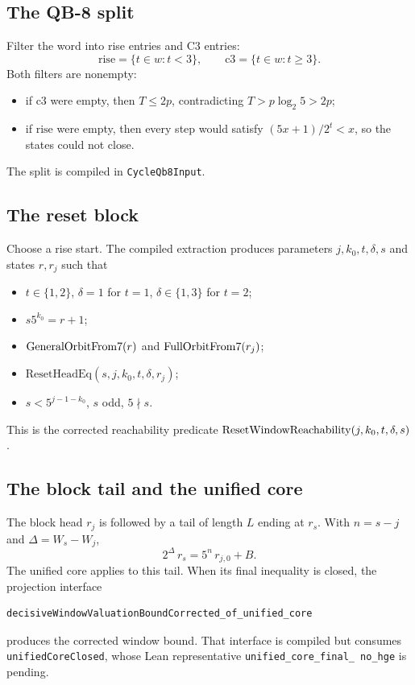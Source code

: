 \subsection{The QB-8 split}

Filter the word into rise entries and C3 entries:
\begin{equation*}
  \mathrm{rise}=\{t\in w:t<3\},
  \qquad
  \mathrm{c3}=\{t\in w:t\ge3\}.
\end{equation*}
Both filters are nonempty:
\begin{itemize}[leftmargin=*]
\item if $\mathrm{c3}$ were empty, then $T\le2p$, contradicting
  $T>p\log_2 5>\allowbreak2p$;
\item if $\mathrm{rise}$ were empty, then every step would satisfy
  $(5x+1)/2^t<x$, so the states could not close.
\end{itemize}
The split is compiled in \texttt{CycleQb8Input}.

\subsection{The reset block}

Choose a rise start.  The compiled extraction produces parameters
$j,k_0,t,\delta,s$ and states $r,r_j$ such that
\begin{itemize}[leftmargin=*]
\item $t\in\{1,2\}$, $\delta=1$ for $t=1$,
  $\delta\in\{1,3\}$ for $t=2$;
\item $s5^{k_0}=r+1$;
\item $\mathrm{GeneralOrbitFrom7}(r)$ and $\mathrm{FullOrbitFrom7}(r_j)$;
\item $\mathrm{ResetHeadEq}(s,j,k_0,t,\delta,r_j)$;
\item $s<5^{j-1-k_0}$, $s$ odd, $5\nmid s$.
\end{itemize}
This is the corrected reachability predicate
$\mathrm{ResetWindowReachability}(j,k_0,t,\delta,s)$.

\subsection{The block tail and the unified core}

The block head $r_j$ is followed by a tail of length $L$ ending at
$r_s$.  With $n=s-j$ and $\Delta=W_s-W_j$,
\begin{equation*}
  2^{\Delta}\,r_s=5^n\,r_{j,0}+B.
\end{equation*}
The unified core applies to this tail.  When its final inequality is
closed, the projection interface
\begin{verbatim}
decisiveWindowValuationBoundCorrected_of_unified_core
\end{verbatim}
produces the corrected window bound.  That interface is compiled but
consumes \texttt{unifiedCoreClosed}, whose Lean representative
\texttt{unified\_\allowbreak core\_\allowbreak final\_\allowbreak
no\_\allowbreak hge} is pending.

